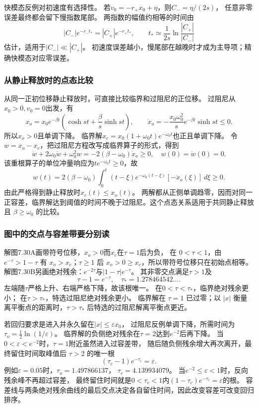\documentclass[UTF8,fontset=fandol,a4paper,11pt]{ctexart}
\begin{document}
快模态反例对初速度有选择性。
若$v_0=-r_+x_0+\eta$，则$C_-=\eta/(2s)$，
任意非零误差最终都会留下慢指数尾部。
两指数的幅值约相等的时间由
\[
|C_-|e^{-r_-t_*}=|C_+|e^{-r_+t_*},\qquad
t_*\simeq\frac{1}{2s}\ln\frac{|C_+|}{|C_-|}
\]
估计，适用于$|C_-|\ll|C_+|$。
初速度误差越小，慢尾部在越晚时才成为主导项；精确快模态对应零误差。

\subsubsection*{从静止释放时的点态比较}
从同一正初位移静止释放时，可直接比较临界和过阻尼的正位移。
过阻尼从$x_0>0,v_0=0$出发，有
\[
x_o=x_0e^{-\beta t}\left(\cosh st+\frac\beta s\sinh st\right),\qquad
\dot x_o=-\frac{x_0\omega_0^2}{s}e^{-\beta t}\sinh st\le0.
\]
所以$x_o>0$且单调下降。
临界解$x_c=x_0(1+\omega_0t)e^{-\omega_0t}$也正且单调下降。
令$w=x_o-x_c$，把过阻尼方程改写成临界算子的形式，得到
\[
\ddot w+2\omega_0\dot w+\omega_0^2w
=-2(\beta-\omega_0)\dot x_o\ge0,\quad w(0)=\dot w(0)=0.
\]
该重根算子的单位冲量响应为$t e^{-\omega_0t}\ge0$，故
\[
w(t)=2(\beta-\omega_0)\int_0^t(t-\xi)e^{-\omega_0(t-\xi)}
[-\dot x_o(\xi)]\,d\xi\ge0.
\]
由此严格得到静止释放时$x_c(t)\le x_o(t)$。
两解都从正侧单调趋零，因而对同一正容差，临界解达到阈值的时间不晚于过阻尼。这个点态关系适用于共同静止释放且 $\beta\ge\omega_0$ 的比较。

\subsubsection*{图中的交点与容差带要分别读}
解图7.30A画带符号位移，$x_o>0$而$x_c$在$\tau=1$后为负，
在 $0<\tau<1$，由 $e^{-\tau}>1-\tau$ 有 $x_o>x_c$；$\tau\ge1$ 后 $x_o>0\ge x_c$，所以带符号位移只在初始点相等。
解图7.30B另画绝对残余：$e^{-2\tau}$与$|1-\tau|e^{-\tau}$。
其非零交点满足$\tau>1$及
\[
\tau-1=e^{-\tau},\quad
\tau_*=1.278464542\ldots.
\]
左端随$\tau$严格上升、右端严格下降，故该根唯一。
在$0<\tau<\tau_*$，临界绝对残余更小；
在$\tau>\tau_*$，特选过阻尼绝对残余更小。
临界解在 $\tau=1$ 已过零；以 $|x|$ 衡量离平衡点的距离时，$\tau>\tau_*$ 后特选的过阻尼解离平衡点更近。

若回归要求是进入并永久留在$|x|\le\varepsilon x_0$，
过阻尼反例单调下降，所需时间为
$\tau_o=\tfrac12\ln(1/\varepsilon)$。
临界解的负侧绝对残余在$\tau=2$达到$e^{-2}$后再下降。
当$0<\varepsilon<e^{-2}$时，$\tau=1$附近虽然进入过容差带，
随后随负侧残余增大再次离开，最终留住时间取峰值后 $\tau>2$ 的唯一根
\[
(\tau_c-1)e^{-\tau_c}=\varepsilon.
\]
例如$\varepsilon=0.05$时，$\tau_o=1.497866137$，
$\tau_c=4.139934079$。
当$e^{-2}\le\varepsilon<1$时，反向残余峰不再超过容差，
最终留住时间就是$0<\tau_c<1$内$(1-\tau_c)e^{-\tau_c}=\varepsilon$的根。
容差线与两条绝对残余曲线的最后交点决定各自留住时间，因此改变容差可改变回归排序。
\end{document}
